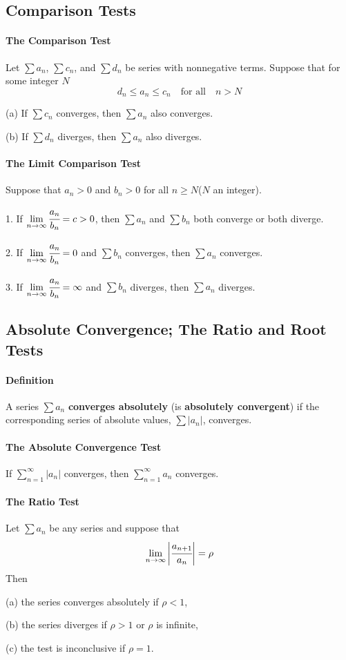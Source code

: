\documentclass{article}
\begin{document}
        \subsection{Comparison Tests}
            \paragraph{The Comparison Test} Let $\sum a_n$, $\sum c_n$, and $\sum d_n$ be series with nonnegative terms. Suppose that for some integer $N$
            \[d_n\le a_n\le c_n\quad \text{for all}\quad n>N\]
            \par (a) If $\sum c_n$ converges, then $\sum a_n$ also converges.
            \par (b) If $\sum d_n$ diverges, then $\sum a_n $ also diverges.
            \paragraph{The Limit Comparison Test}
            Suppose that $a_n>0$ and $b_n>0$ for all $n\ge N$($N$ an integer). 
            \par 1. If $\lim\limits_{n\to\infty}\cfrac{a_n}{b_n}=c>0$, then $\sum a_n$ and $\sum b_n$ both converge or both diverge.
            \par 2. If $\lim\limits_{n\to\infty}\cfrac{a_n}{b_n}=0$ and $\sum b_n$ converges, then $\sum a_n$ converges.
            \par 3. If $\lim\limits_{n\to\infty}\cfrac{a_n}{b_n}=\infty$ and $\sum b_n$ diverges, then $\sum a_n$ diverges.
        \subsection{Absolute Convergence; The Ratio and Root Tests}
            \paragraph{Definition} A series $\sum a_n$ \textbf{converges absolutely} (is \textbf{absolutely convergent}) if the corresponding series of absolute values, $\sum|a_n|$, converges.
            \paragraph{The Absolute Convergence Test} If $\sum_{n=1}^\infty |a_n|$ converges, then $\sum_{n=1}^\infty a_n$ converges.
            \paragraph{The Ratio Test} Let $\sum a_n$ be any series and suppose that
            \[\lim\limits_{n\to\infty}\bigg|\cfrac{a_{n+1}}{a_n}\bigg|=\rho\]
            Then
            \par (a) the series converges absolutely if $\rho <1$,
            \par (b) the series diverges if $\rho >1$ or $\rho$ is infinite,
            \par (c) the test is inconclusive if $\rho=1$.
\end{document}
